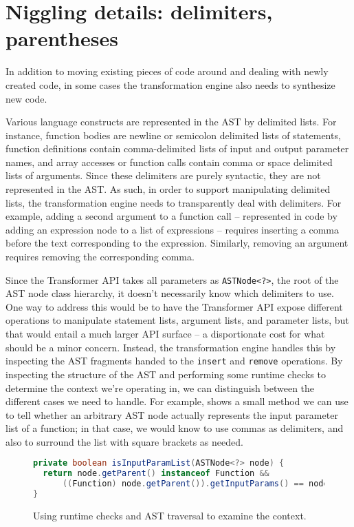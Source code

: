 \section{Niggling details: delimiters, parentheses}

In addition to moving existing pieces of code around and dealing with newly
created code, in some cases the transformation engine also needs to synthesize
new code.

Various \matlab language constructs are represented in the AST by delimited
lists. For instance, function bodies are newline or semicolon delimited lists
of statements, function definitions contain comma-delimited lists of input and
output parameter names, and array accesses or function calls contain comma or
space delimited lists of arguments. Since these delimiters are purely
syntactic, they are not represented in the AST. As such, in order to support
manipulating delimited lists, the transformation engine needs to transparently
deal with delimiters. For example, adding a second argument to a function call
-- represented in code by adding an expression node to a list of expressions --
requires inserting a comma before the text corresponding to the expression.
Similarly, removing an argument requires removing the corresponding comma.

Since the Transformer API takes all parameters as \texttt{ASTNode<?>}, the root
of the AST node class hierarchy, it doesn't necessarily know which delimiters
to use. One way to address this would be to have the Transformer API expose
different operations to manipulate statement lists, argument lists, and
parameter lists, but that would entail a much larger API surface -- a
disportionate cost for what should be a minor concern. Instead, the
transformation engine handles this by inspecting the AST fragments handed to
the \texttt{insert} and \texttt{remove} operations. By inspecting the structure
of the AST and performing some runtime checks to determine the context we're
operating in, we can distinguish between the different cases we need to handle.
For example,  shows a small method we can use to tell
whether an arbitrary AST node actually represents the input parameter list of a
function; in that case, we would know to use commas as delimiters, and also to
surround the list with square brackets as needed.

\begin{figure}
\begin{lstlisting}[language=Java, numbers=none]
private boolean isInputParamList(ASTNode<?> node) {
  return node.getParent() instanceof Function &&
      ((Function) node.getParent()).getInputParams() == node;
}
\end{lstlisting}
\caption{Using runtime checks and AST traversal to examine the context.}
\label{Fig:WhereAreWe}
\end{figure}

